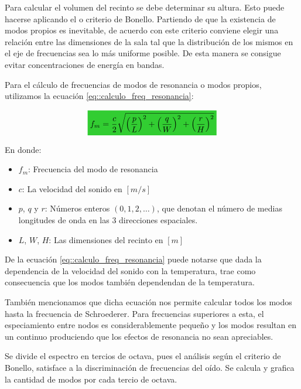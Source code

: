 \par Para calcular el volumen del recinto se debe determinar su altura. Esto puede hacerse aplicando el  o criterio de Bonello. Partiendo de que la existencia de modos propios es inevitable, de acuerdo con este criterio conviene elegir una relación entre las dimensiones de la sala tal que la distribución de los mismos en el eje de frecuencias sea lo más uniforme posible. De esta manera se consigue evitar concentraciones de energía en bandas.

\par Para el cálculo de frecuencias de modos de resonancia o modos propios, utilizamos la ecuación \eqref{eq::calculo_freq_resonancia}:

\begin{equation}
    \mathcolorbox{EQColor}{ f_m = \frac{c}{2} \sqrt{\Big(\frac{p}{L} \Big)^2 + \Big(\frac{q}{W} \Big)^2 + \Big(\frac{r}{H} \Big)^2 } }
    \label{eq::calculo_freq_resonancia}
\end{equation}

\par En donde:
\begin{itemize}
    \item $f_m$: Frecuencia del modo de resonancia
    \item $c$: La velocidad del sonido en $[m/s]$
    \item $p$, $q$ y $r$: Números enteros $(0, 1, 2, \ldots)$, que denotan el número de medias longitudes de onda en las 3 direcciones espaciales.
    \item $L$, $W$, $H$: Las dimensiones del recinto en $[m]$
\end{itemize}

\par De la ecuación \eqref{eq::calculo_freq_resonancia} puede notarse que dada la dependencia de la velocidad del sonido con la temperatura, trae como consecuencia que los modos también dependendan de la temperatura.

\par También mencionamos que dicha ecuación nos permite calcular todos los modos hasta la frecuencia de Schroederer. Para frecuencias superiores a esta, el especiamiento entre nodos es considerablemente pequeño y los modos resultan en un continuo produciendo que los efectos de resonancia no sean apreciables.\\

\par Se divide el espectro en tercios de octava, pues el análisis según el criterio de Bonello, satisface a la discriminación de frecuencias del oído. Se calcula y grafica la cantidad de modos por cada tercio de octava.

